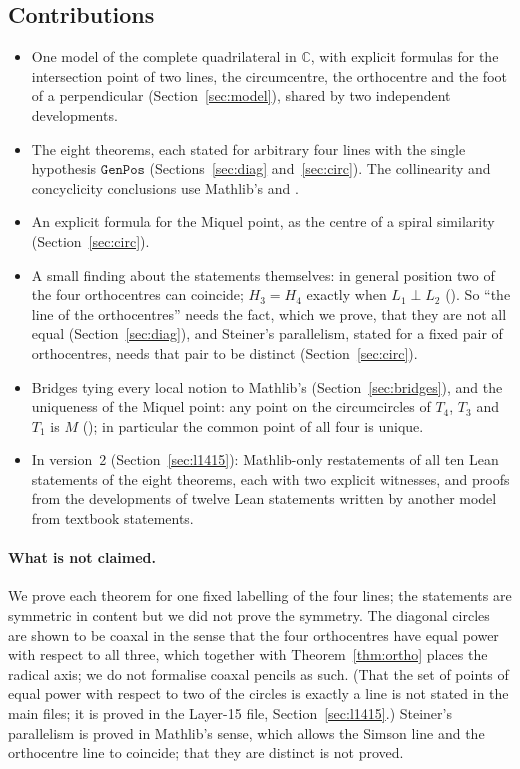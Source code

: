 \documentclass[11pt]{article}
\theoremstyle{definition}
\theoremstyle{remark}
\newcommand{\lean}[1]{\texttt{#1}}
\newcommand{\CC}{\mathbb{C}}
\begin{document}
\subsection{Contributions}
\begin{itemize}
\item One model of the complete quadrilateral in $\CC$, with explicit formulas for the intersection
point of two lines, the circumcentre, the orthocentre and the foot of a perpendicular
(Section~\ref{sec:model}), shared by two independent developments.
\item The eight theorems, each stated for arbitrary four lines with the single hypothesis
$\lean{GenPos}$ (Sections~\ref{sec:diag} and~\ref{sec:circ}). The collinearity and concyclicity
conclusions use Mathlib's  and .
\item An explicit formula for the Miquel point, as the centre of a spiral similarity
(Section~\ref{sec:circ}).
\item A small finding about the statements themselves: in general position two of the four
orthocentres can coincide; $H_3=H_4$ exactly when $L_1\perp L_2$ ().
So ``the line of the orthocentres'' needs the fact, which we prove, that they are not all equal
(Section~\ref{sec:diag}), and Steiner's parallelism, stated for a fixed pair of orthocentres, needs
that pair to be distinct (Section~\ref{sec:circ}).
\item Bridges tying every local notion to Mathlib's (Section~\ref{sec:bridges}), and the uniqueness of
the Miquel point: any point on the circumcircles of $T_4$, $T_3$ and $T_1$ is $M$
(); in particular the common point of all four is unique.
\item In version~2 (Section~\ref{sec:l1415}): Mathlib-only restatements of all ten Lean statements of
the eight theorems, each with two explicit witnesses, and proofs from the developments of twelve Lean
statements written by another model from textbook statements.
\end{itemize}

\paragraph{What is not claimed.} We prove each theorem for one fixed labelling of the four lines; the
statements are symmetric in content but we did not prove the symmetry. The diagonal circles are shown
to be coaxal in the sense that the four orthocentres have equal power with respect to all three, which
together with Theorem~\ref{thm:ortho} places the radical axis; we do not formalise coaxal pencils as
such. (That the set of points of equal power with respect to two of the circles is exactly a line is
not stated in the main files; it is proved in the Layer-15 file, Section~\ref{sec:l1415}.) Steiner's
parallelism is proved in Mathlib's sense, which allows the Simson line and the orthocentre line to
coincide; that they are distinct is not proved.
\end{document}
